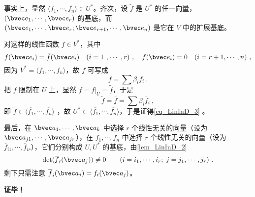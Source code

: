 事实上，显然 $\langle\overline{f_1},\cdots,\overline{f_n}\rangle \in U^*$。齐次，设 $\tilde f$ 是 $U^*$ 的任一向量，$(\bvec e_1,\cdots,\bvec e_r)$ 的基底，而 $(\bvec e_1,\cdots,\bvec e_r;\bvec e_{r+1},\cdots,\bvec e_n)$ 是它在 $V$ 中的扩展基底。

对这样的线性函数 $f\in V^*$，其中 
\begin{equation}
f(\bvec e_i)=\tilde f(\bvec e_i) \quad(i=1~,\cdots ~,r)~,\quad f(\bvec e_i)=0
\quad (i=r+1,\cdots,n)~,
\end{equation}
因为 $V^*=\langle f_1,\cdots,f_n\rangle$，故 $f$ 可写成
\begin{equation}
f=\sum \beta_if_i~.
\end{equation}
把 $f$ 限制在 $U$ 上，显然 $\overline f=f|_U=\tilde f$，于是
\begin{equation}
\tilde f=\overline f=\sum \beta_i \overline f_i~,
\end{equation}
即 $\tilde f\in\langle\overline{f_1},\cdots,\overline{f_n}\rangle$ ，故 $U^*\subset\langle\overline{f_1},\cdots,\overline{f_n}\rangle$，于是证得\autoref{eq_LinInD_3} 。

最后，在 $\bvec a_1,\cdots,\bvec a_k$ 中选择 $r$ 个线性无关的向量（设为 $\bvec a_{j1},\cdots,\bvec a_{jr} $），在 $\overline f_1,\cdots ,\overline f_n$ 中选择 $r$ 个线性无关的向量（设为 $\overline f_{i1},\cdots,\overline f_{ir}$），它们分别构成 $U,U^*$ 的基底，由\autoref{lem_LinInD_2} 
\begin{equation}
\det(\overline f_i(\bvec a_j))\neq0 \qquad (i=i_1,\cdots ,i_r;\; j=j_1,\cdots,j_r)~.
\end{equation}
剩下只需注意 $\overline f_i(\bvec a_j)=f_i(\bvec a_j)$。

\textbf{证毕！}
